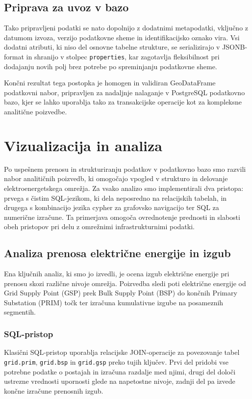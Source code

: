 \documentclass[a4paper,12pt,openright]{book}
\begin{document}
\subsection{Priprava za uvoz v bazo}

Tako pripravljeni podatki se nato dopolnijo z dodatnimi metapodatki, vključno z datumom izvoza, verzijo podatkovne sheme in identifikacijsko oznako vira. Vsi dodatni atributi, ki niso del osnovne tabelne strukture, se serializirajo v JSONB-format in shranijo v stolpec \texttt{properties}, kar zagotavlja fleksibilnost pri dodajanju novih polj brez potrebe po spreminjanju podatkovne sheme.

Končni rezultat tega postopka je homogen in validiran GeoDataFrame podatkovni nabor, pripravljen za nadaljnje nalaganje v PostgreSQL podatkovno bazo, kjer se lahko uporablja tako za transakcijske operacije kot za kompleksne analitične poizvedbe.

\section{Vizualizacija in analiza}

Po uspešnem prenosu in strukturiranju podatkov v podatkovno bazo smo razvili nabor analitičnih poizvedb, ki omogočajo vpogled v strukturo in delovanje elektroenergetskega omrežja. Za vsako analizo smo implementirali dva pristopa: prvega s čistim SQL-jezikom, ki dela neposredno na relacijskih tabelah, in drugega s kombinacijo jezika cypher za grafovsko navigacijo ter SQL za numerične izračune. Ta primerjava omogoča ovrednotenje prednosti in slabosti obeh pristopov pri delu z omrežnimi infrastrukturnimi podatki.

\subsection{Analiza prenosa električne energije in izgub}

Ena ključnih analiz, ki smo jo izvedli, je ocena izgub električne energije pri prenosu skozi različne nivoje omrežja. Poizvedba sledi poti električne energije od Grid Supply Point (GSP) prek Bulk Supply Point (BSP) do končnih Primary Substation (PRIM) točk ter izračuna kumulativne izgube na posameznih segmentih.

\subsubsection{SQL-pristop}

Klasični SQL-pristop uporablja relacijske JOIN-operacije za povezovanje tabel \texttt{grid.prim}, \texttt{grid.bsp} in \texttt{grid.gsp} preko tujih ključev. Prvi del pridobi vse potrebne podatke o postajah in izračuna razdalje med njimi, drugi del določi ustrezne vrednosti upornosti glede na napetostne nivoje, zadnji del pa izvede končne izračune prenosnih izgub.
\end{document}
